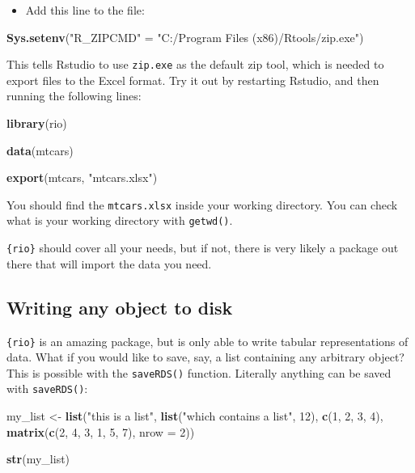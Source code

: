 \documentclass[]{gitbook}
\newenvironment{Shaded}{\begin{snugshade}}{\end{snugshade}}
\newcommand{\DataTypeTok}[1]{\textcolor[rgb]{0.13,0.29,0.53}{#1}}
\newcommand{\DecValTok}[1]{\textcolor[rgb]{0.00,0.00,0.81}{#1}}
\newcommand{\KeywordTok}[1]{\textcolor[rgb]{0.13,0.29,0.53}{\textbf{#1}}}
\newcommand{\NormalTok}[1]{#1}
\newcommand{\StringTok}[1]{\textcolor[rgb]{0.31,0.60,0.02}{#1}}
\providecommand{\tightlist}{%
  \setlength{\itemsep}{0pt}\setlength{\parskip}{0pt}}
\begin{document}
\begin{itemize}
\tightlist
\item
  Add this line to the file:
\end{itemize}

\begin{Shaded}
\begin{Highlighting}[]
\KeywordTok{Sys.setenv}\NormalTok{(}\StringTok{"R_ZIPCMD"}\NormalTok{ =}\StringTok{ "C:/Program Files (x86)/Rtools/zip.exe"}\NormalTok{)}
\end{Highlighting}
\end{Shaded}

This tells Rstudio to use \texttt{zip.exe} as the default zip tool, which is needed to export files to the
Excel format. Try it out by restarting Rstudio, and then running the following lines:

\begin{Shaded}
\begin{Highlighting}[]
\KeywordTok{library}\NormalTok{(rio)}

\KeywordTok{data}\NormalTok{(mtcars)}

\KeywordTok{export}\NormalTok{(mtcars, }\StringTok{"mtcars.xlsx"}\NormalTok{)}
\end{Highlighting}
\end{Shaded}

You should find the \texttt{mtcars.xlsx} inside your working directory. You can check what is your working
directory with \texttt{getwd()}.

\texttt{\{rio\}} should cover all your needs, but if not, there is very likely a package out there that will
import the data you need.

\hypertarget{writing-any-object-to-disk}{%
\subsection{Writing any object to disk}\label{writing-any-object-to-disk}}

\texttt{\{rio\}} is an amazing package, but is only able to write tabular representations of data. What if you
would like to save, say, a list containing any arbitrary object? This is possible with the
\texttt{saveRDS()} function. Literally anything can be saved with \texttt{saveRDS()}:

\begin{Shaded}
\begin{Highlighting}[]
\NormalTok{my_list <-}\StringTok{ }\KeywordTok{list}\NormalTok{(}\StringTok{"this is a list"}\NormalTok{, }\KeywordTok{list}\NormalTok{(}\StringTok{"which contains a list"}\NormalTok{, }\DecValTok{12}\NormalTok{), }\KeywordTok{c}\NormalTok{(}\DecValTok{1}\NormalTok{, }\DecValTok{2}\NormalTok{, }\DecValTok{3}\NormalTok{, }\DecValTok{4}\NormalTok{), }\KeywordTok{matrix}\NormalTok{(}\KeywordTok{c}\NormalTok{(}\DecValTok{2}\NormalTok{, }\DecValTok{4}\NormalTok{,}
\DecValTok{3}\NormalTok{, }\DecValTok{1}\NormalTok{, }\DecValTok{5}\NormalTok{, }\DecValTok{7}\NormalTok{), }\DataTypeTok{nrow =} \DecValTok{2}\NormalTok{))}

\KeywordTok{str}\NormalTok{(my_list)}
\end{Highlighting}
\end{Shaded}
\end{document}
